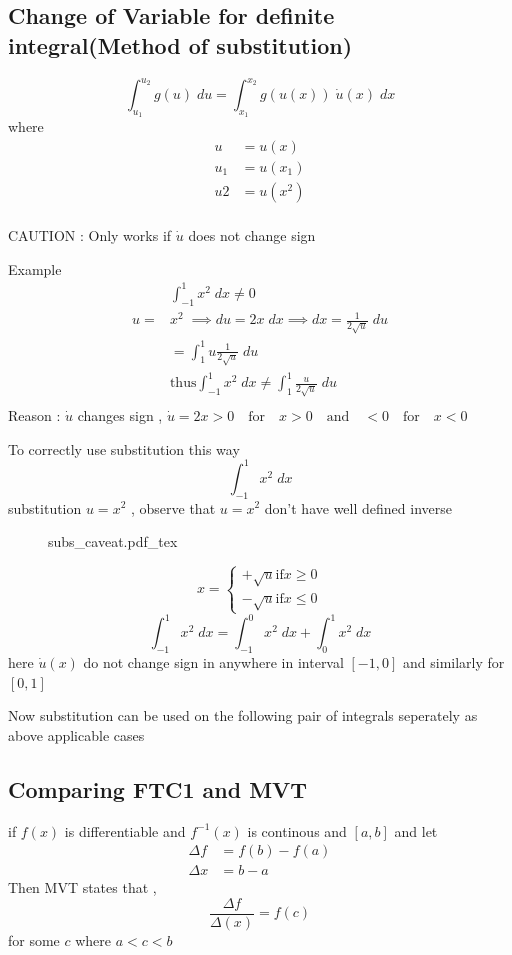 \subsection{Change of Variable for definite integral(Method of substitution)}
  \[
	\int_{u_{1}}^{u_{2}} g(u) \; du = \int_{x_{1}}^{x_{2}} g(u(x)) \; \dot{u}(x) \; dx 
  \]
  where
  \begin{align*}
	  u &= u(x) \\
	  u_{1} &= u(x_{1}) \\
	  u2 &= u(x^{2}) \\
  \end{align*}

CAUTION : Only works if $\dot{u}$ does not change sign 

Example 
\begin{align*}
    &\int_{-1}^{1} x^{2} \; dx \neq 0 \\
	u =& x^{2} \; \implies du = 2x \; dx \implies dx = \frac{1}{2\sqrt{u}} \; du \\
	   &= \int_{1}^{1} u \frac{1}{2\sqrt{u}} \; du \\
	   &\text{thus} \int_{-1}^{1} x^{2} \; dx \neq \int_{1}^{1} \frac{u}{2\sqrt{u}} \; du\\
\end{align*}
 Reason : $\dot{u}$ changes sign , $\dot{u} = 2x > 0 \quad \text{for}\quad x>0 \quad \text{and} \quad  < 0 \quad \text{for}\quad x < 0 $

 To correctly use substitution this way 
  \[
	\int_{-1}^{1} x^{2} \; dx 
  \]
substitution $u = x^{2}$  , observe that $u = x^{2}$ don't have well defined inverse 
\begin{figure}[H]
	\centering
	\def\svgwidth{\columnwidth}
	{subs_caveat.pdf_tex}
\end{figure}
   \[
	   x = 
	\begin{cases}
	   + \sqrt{u} \text{if} x \ge 0 \\
	   - \sqrt{u} \text{if} x \le 0
	\end{cases}	
   \]
      \[
   	\int_{-1}^{1} x^{2} \; dx = \int_{-1}^{0} x^{2} \; dx + \int_{0}^{1} x^{2} \; dx
      \]
      here $\dot{u}(x)$ do not change sign in anywhere in interval $[-1, 0]$ 
      and similarly for $[0,1]$ 

      Now substitution can  be used on the following pair of integrals seperately 
      as above applicable cases  

\subsection{Comparing FTC1 and MVT} 
if $f(x)$ is differentiable and $f^{-1}(x)$ is continous and $[a,b]$ and let
\begin{align*}
	\Delta{f} &= f(b) - f(a) \\
	\Delta{x} &= b-a 
\end{align*}
Then MVT states that , 
   \[
	\frac{\Delta{f}}{\Delta(x)} = f(c)
   \]
   for some $c$ where $a<c<b$ 

